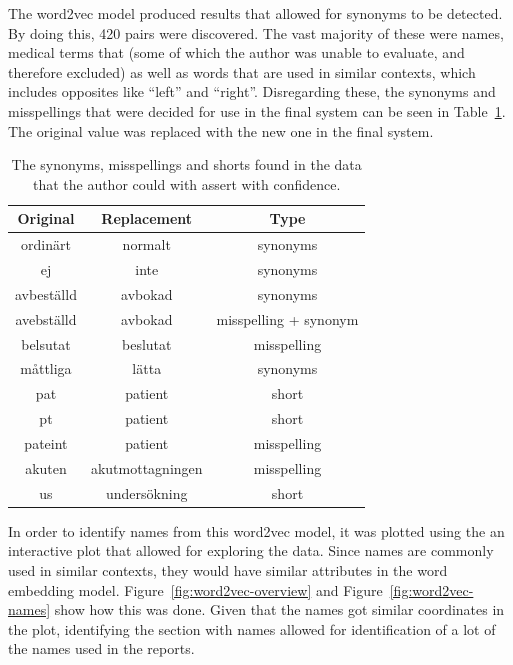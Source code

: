 The word2vec model produced results that allowed for synonyms to be detected.
By doing this, 420 pairs were discovered.
The vast majority of these were names, medical terms that (some of which the author was unable to evaluate, and therefore excluded) as well as words that are used in similar contexts, which includes opposites like ``left'' and ``right''.
Disregarding these, the synonyms and misspellings that were decided for use in the final system can be seen in Table~\ref{tab:synonyms}.
The original value was replaced with the new one in the final system.

\begin{table}
    \centering
    \begin{tabular}{|ccc|}
        \hline
        \textbf{Original} & \textbf{Replacement} & \textbf{Type} \\
        \hline
        ordinärt & normalt & synonyms \\
        ej & inte & synonyms \\
        avbeställd & avbokad & synonyms \\
        avebställd & avbokad & misspelling + synonym \\
        belsutat & beslutat & misspelling \\
        måttliga & lätta & synonyms \\
        pat & patient & short \\
        pt & patient & short \\
        pateint & patient & misspelling \\
        akuten & akutmottagningen & misspelling \\
        us & undersökning & short \\
        \hline
    \end{tabular}
    \caption{The synonyms, misspellings and shorts found in the data that the author could with assert with confidence.}
    \label{tab:synonyms}
\end{table}

In order to identify names from this word2vec model, it was plotted using the an interactive plot that allowed for exploring the data.
Since names are commonly used in similar contexts, they would have similar attributes in the word embedding model.
Figure~\ref{fig:word2vec-overview} and Figure~\ref{fig:word2vec-names} show how this was done.
Given that the names got similar coordinates in the plot, identifying the section with names allowed for identification of a lot of the names used in the reports.

